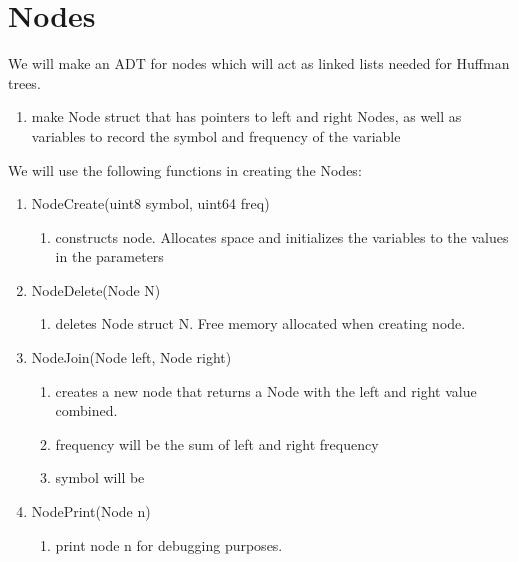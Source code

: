 \documentclass[11pt]{article}
\begin{document}
\section{Nodes}\label{ss:Nodes}
We will make an ADT for nodes which will act as linked lists needed for Huffman trees.
\begin{enumerate}
\item make Node struct that has pointers to left and right Nodes, as well as variables to record the symbol and frequency of the variable
\end{enumerate}
We will use the following functions in creating the Nodes:
\begin{enumerate}
\item NodeCreate(uint8  symbol, uint64 freq)
	\begin{enumerate}
	\item constructs node. Allocates space and initializes the variables to the values in the parameters
	\end{enumerate}
\item NodeDelete(Node N)
	\begin{enumerate}
	\item deletes Node struct N. Free memory allocated when creating node. 
	\end{enumerate}
\item NodeJoin(Node left, Node right)
	\begin{enumerate}
	\item creates a new node that returns a Node with the left and right value combined.
	\item frequency will be the sum of left and right frequency
	\item symbol will be \textdollar
	\end{enumerate}
\item NodePrint(Node n)
	\begin{enumerate}
	\item print node n for debugging purposes.
	\end{enumerate}
\end{enumerate}
\end{document}
